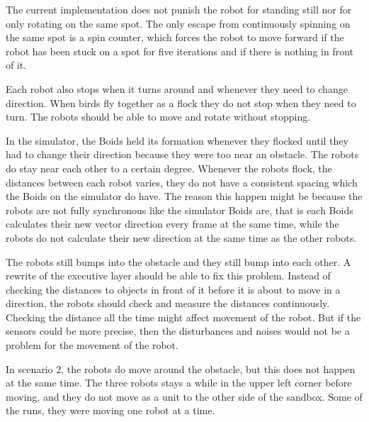 The current implementation does not punish the robot for standing still nor for only rotating on the same spot. The only escape from continuously spinning on the same spot is a spin counter, which forces the robot to move forward if the robot has been stuck on a spot for five iterations and if there is nothing in front of it. 

Each robot also stops when it turns around and whenever they need to change direction. When birds fly together as a flock they do not stop when they need to turn. The robots should be able to move and rotate without stopping.

In the simulator, the Boids held its formation whenever they flocked until they had to change their direction because they were too near an obstacle. The robots do stay near each other to a certain degree. Whenever the robots flock, the distances between each robot varies, they do not have a consistent spacing which the Boids on the simulator do have. The reason this happen might be because the robots are not fully synchronous like the simulator Boids are, that is each Boids calculates their new vector direction every frame at the same time, while the robots do not calculate their new direction at the same time as the other robots. 

The robots still bumps into the obstacle and they still bump into each other. A rewrite of the executive layer should be able to fix this problem. Instead of checking the distances to objects in front of it before it is about to move in a direction, the robots should check and measure the distances continuously. Checking the distance all the time might affect movement of the robot. But if the sensors could be more precise, then the disturbances and noises would not be a problem for the movement of the robot.

In scenario 2, the robots do move around the obstacle, but this does not happen at the same time. The three robots stays a while in the upper left corner before moving, and they do not move as a unit to the other side of the sandbox. Some of the runs, they were moving one robot at a time. 




